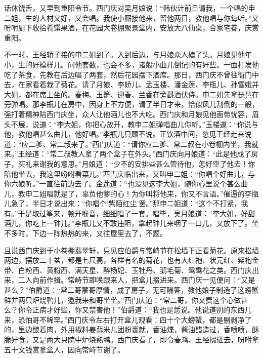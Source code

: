 话休饶舌，又早到重阳令节。西门庆对吴月娘说：“韩伙计前日请我，一个唱的申二姐，生的人材又好，又会唱。我使小厮接他来，留他两日，教他唱与你每听。”又吩咐厨下收拾肴馔果酒，在花园大卷棚聚景堂内，安放大八仙桌，合家宅眷，庆赏重阳。

不一时，王经轿子接的申二姐到了。入到后边，与月娘众人磕了头。月娘见他年小，生的好模样儿。问他套数，也会不多，诸般小曲儿倒记的有好些。一面打发他吃了茶食，先教在后边唱了两套，然后花园摆下酒席。那日，西门庆不曾往衙门中去，在家看着栽了菊花。请了月娘、李娇儿、孟玉楼、潘金莲、李瓶儿、孙雪娥并大姐，都在席上坐的。春梅、玉箫、迎春、兰香在旁斟酒伏侍。申二姐先拿琵琶在旁弹唱。那李瓶儿在房中，因身上不方便，请了半日才来。恰似风儿刮倒的一般，强打着精神陪西门庆坐，众人让他酒儿也不大吃。西门庆和月娘见他面带忧容，眉头不展，说道：“李大姐，你把心放开，教申二姐弹唱曲儿你听。”玉楼道：“你说与他，教他唱甚么曲儿，他好唱。”李瓶儿只顾不说。正饮酒中间，忽见王经走来说道：“应二爹、常二叔来了。”西门庆道：“请你应二爹、常二叔在小卷棚内坐，我就来。”王经道：“常二叔教人拿了两个盒子在外头。”西门庆向月娘道：“此是他成了房子，买礼来谢我的意思。”月娘道：“少不的安排些甚么管待他，怎好空了他去！你陪他坐去，我这里吩咐看菜儿。”西门庆临出来，又叫申二姐：“你唱个好曲儿，与你六娘听。”一直往前边去了。金莲道：“也没见这李大姐，随你心里说个甚么曲儿，教申二姐唱就是了，辜负他爹的心！为你叫将他来，你又不言语。”催逼的李瓶儿急了，半日才说出来：“你唱个‘紫陌红尘’罢。”那申二姐道：“这个不打紧，我有。”于是取过筝来，顿开喉音，细细唱了一套。唱毕，吴月娘道：“李大姐，好甜酒儿，你吃上一钟儿。”李瓶儿又不敢违阻，拿起钟儿来咽了一口儿，又放下了。坐不多时，下边一阵热热的来，又往屋里去了，不题。

且说西门庆到于小卷棚翡翠轩，只见应伯爵与常峙节在松墙下正看菊花。原来松墙两边，摆放二十盆，都是七尺高，各样有名的菊花，也有大红袍、状元红、紫袍金带、白粉西、黄粉西、满天星、醉杨妃、玉牡丹、鹅毛菊、鸳鸯花之类。西门庆出来，二人向前作揖。常峙节即唤跟来人，把盒儿掇进来。西门庆一见便问：“又是甚么？”伯爵道：“常二哥蒙哥厚情，成了房子，无可酬答，教他娘子制造了这螃蟹鲜并两只炉烧鸭儿，邀我来和哥坐坐。”西门庆道：“常二哥，你又费这个心做甚么？你令正病才好些，你又禁害他！”伯爵道：“我也是恁说。他说道别的东西儿来，恐怕哥不稀罕。”西门庆令左右打开盒儿观看：四十个大螃蟹，都是剔剥净了的，里边酿着肉，外用椒料姜蒜米儿团粉裹就，香油煠，酱油醋造过，香喷喷，酥脆好食。又是两大只院中炉烧熟鸭。西门庆看了，即令春鸿、王经掇进去，吩咐拿五十文钱赏拿盒人，因向常峙节谢了。

